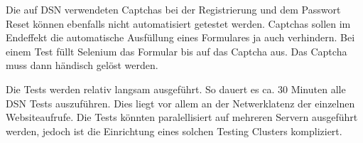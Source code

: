 Die auf DSN verwendeten Captchas bei der Registrierung und dem Passwort Reset können ebenfalls nicht automatisiert getestet werden. Captchas sollen im Endeffekt die automatische Ausfüllung eines Formulares ja auch verhindern. Bei einem Test füllt Selenium das Formular bis auf das Captcha aus. Das Captcha muss dann händisch gelöst werden. 

Die Tests werden relativ langsam ausgeführt. So dauert es ca. 30 Minuten alle DSN Tests auszuführen. Dies liegt vor allem an der Netwerklatenz der einzelnen Websiteaufrufe. Die Tests könnten paralellisiert auf mehreren Servern ausgeführt werden, jedoch ist die Einrichtung eines solchen Testing Clusters kompliziert.
